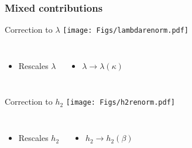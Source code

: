 \documentclass[12pt,a4paper,dvipsnames,usenames]{beamer}
\begin{document}
\begin{frame}
  \frametitle{Mixed contributions}

  \begin{block}{Correction to $\lambda$}
    \centering
    \texttt{[image: Figs/lambdarenorm.pdf]}
    \vspace*{-.5em}

  \begin{columns}
  \begin{itemize}
    \item \color{LightUIBase} Rescales $\lambda$ 
  \end{itemize}
  \begin{itemize}
    \item \color{LightUIBase} $\lambda \to \lambda(\kappa)$
  \end{itemize}
  \end{columns}
  \end{block}
  

  \begin{block}{Correction to $h_2$}
  \centering
  \texttt{[image: Figs/h2renorm.pdf]}
  \vspace*{-.5em}

  \begin{columns}
  \begin{itemize}
    \item \color{LightUIBase} Rescales $h_2$ 
  \end{itemize}
  \begin{itemize}
    \item \color{LightUIBase} $h_2 \to h_2(\beta)$
  \end{itemize}
  \end{columns}
  \end{block}
  
\end{frame}
\end{document}
